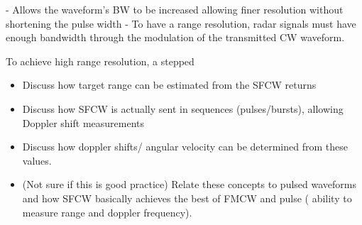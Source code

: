 \documentclass[class=report,11pt,crop=false]{standalone}
\begin{document}
    - Allows the waveform's BW to be increased allowing finer resolution without shortening the pulse width
    - To have a range resolution, radar signals must have enough bandwidth through the modulation of the transmitted CW waveform.

    To achieve high range resolution, a stepped

    \begin{itemize}
        \item Discuss how target range can be estimated from the SFCW returns  %
        \item Discuss how SFCW is actually sent in sequences (pulses/bursts), allowing Doppler shift measurements
        \item Discuss how doppler shifts/ angular velocity can be determined from these values.%
        \item (Not sure if this is good practice) Relate these concepts to pulsed waveforms and how SFCW basically achieves the best of FMCW and pulse ( ability to measure range and doppler frequency).%
    \end{itemize}



\end{document}

